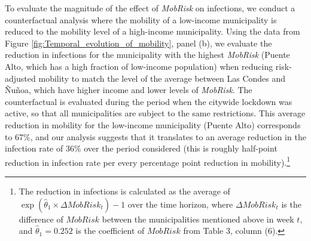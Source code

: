 To evaluate the magnitude of the effect of \textit{MobRisk} on infections, we conduct a counterfactual analysis where the mobility of a low-income municipality is reduced to the mobility level of a high-income municipality. Using the data from Figure \ref{fig:Temporal_evolution_of_mobility}, panel (b), we evaluate the reduction in infections for the municipality with the highest \textit{MobRisk} (Puente Alto, which has a high fraction of low-income population) when reducing risk-adjusted mobility to match the level of the average between Las Condes and Ñuñoa, which have higher income and lower levels of \textit{MobRisk}.  The counterfactual is evaluated during the period when the citywide lockdown was active, so that all municipalities are subject to the same restrictions. This average reduction in mobility for the low-income municipality (Puente Alto) corresponds to 
67\%, and our analysis suggests that it 
 translates to an average  reduction in the infection rate of 36\% over the period considered (this is roughly half-point reduction in infection rate per every percentage point reduction in mobility).\footnote{
 The reduction in infections is calculated as the average of $\exp(\hat\theta_1\times \Delta MobRisk_t)-1$ over the time horizon, where $\Delta MobRisk_t$ is the difference of $MobRisk$ between the municipalities mentioned above in week $t$, and  $\hat\theta_1=0.252$ is the coefficient of $MobRisk$ from Table 3, column (6).}




